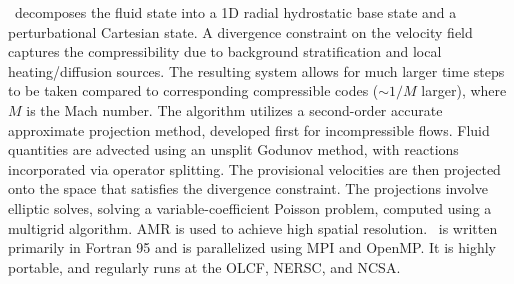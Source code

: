 \documentclass[11pt,letterpaper,english]{article}
\begin{document}

\maestro\ decomposes the fluid state into a 1D radial hydrostatic base
state and a perturbational Cartesian state.  A divergence constraint
on the velocity field captures the compressibility due to background
stratification and local heating/diffusion sources.  The resulting
system allows for much larger time steps to be taken compared to
corresponding compressible codes ($\sim 1/M$ larger), where $M$ is 
the Mach number.
The algorithm
\cite{multilevel} utilizes a second-order accurate approximate
projection method, developed first for incompressible flows.  Fluid
quantities are advected using an unsplit Godunov method, with
reactions incorporated via operator splitting.  The provisional
velocities are then projected onto the space that satisfies the
divergence constraint.  The projections involve elliptic solves,
solving a variable-coefficient Poisson problem,
computed using a multigrid algorithm.  AMR is
used to achieve high spatial resolution.  \maestro\ is written primarily
in Fortran 95 and is parallelized using MPI and OpenMP.  It is highly
portable, and regularly runs at the OLCF, NERSC, and NCSA.
\end{document}
